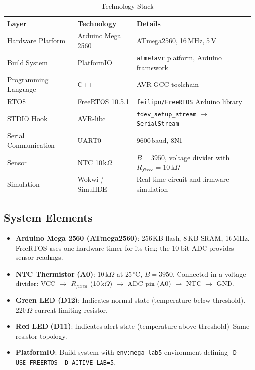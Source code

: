\documentclass[12pt]{article}
\begin{document}
\begin{table}[H]
\centering
\begin{tabular}{@{}lll@{}}
\toprule
\textbf{Layer} & \textbf{Technology} & \textbf{Details} \\
\midrule
Hardware Platform    & Arduino Mega 2560  & ATmega2560, 16\,MHz, 5\,V \\
Build System         & PlatformIO         & \texttt{atmelavr} platform, Arduino framework \\
Programming Language & C++                & AVR-GCC toolchain \\
RTOS                 & FreeRTOS 10.5.1    & \texttt{feilipu/FreeRTOS} Arduino library \\
STDIO Hook           & AVR-libc           & \texttt{fdev\_setup\_stream} $\to$ \texttt{SerialStream} \\
Serial Communication & UART0              & 9600\,baud, 8N1 \\
Sensor               & NTC 10\,k$\Omega$  & $B = 3950$, voltage divider with $R_{fixed} = 10$\,k$\Omega$ \\
Simulation           & Wokwi / SimulIDE   & Real-time circuit and firmware simulation \\
\bottomrule
\end{tabular}
\caption{Technology Stack}
\label{tab:techstack}
\end{table}

\subsection{System Elements}

\begin{itemize}
  \item \textbf{Arduino Mega 2560 (ATmega2560)}: 256\,KB flash, 8\,KB SRAM, 16\,MHz. FreeRTOS uses one hardware timer for its tick; the 10-bit ADC provides sensor readings.
  \item \textbf{NTC Thermistor (A0)}: 10\,k\(\Omega\) at 25\,\(^{\circ}\)C, \(B = 3950\). Connected in a voltage divider: VCC \(\to\) \(R_{fixed}\) (10\,k\(\Omega\)) \(\to\) ADC pin (A0) \(\to\) NTC \(\to\) GND.
  \item \textbf{Green LED (D12)}: Indicates normal state (temperature below threshold). 220\,\(\Omega\) current-limiting resistor.
  \item \textbf{Red LED (D11)}: Indicates alert state (temperature above threshold). Same resistor topology.
  \item \textbf{PlatformIO}: Build system with \texttt{env:mega\_lab5} environment defining \texttt{-D USE\_FREERTOS -D ACTIVE\_LAB=5}. \cite{pio}
\end{itemize}
\end{document}
